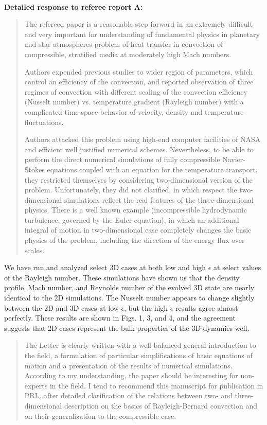 \documentclass[aps, 11pt, singlecolumn]{revtex4-1} %
\begin{document}
\begin{singlespace}
$\,$
\newline
$\,$
\newline

\textbf{Detailed response to referee report A:}

\begin{quotation}
The refereed paper is a reasonable step forward in an extremely
difficult and very important for understanding of fundamental physics
in planetary and star atmospheres problem of heat transfer in
convection of compressible, stratified media at moderately high Mach
numbers.

Authors expended previous studies to wider region of parameters, which
control an efficiency of the convection, and reported observation of
three regimes of convection with different scaling of the convection
efficiency (Nusselt number) vs. temperature gradient (Rayleigh number)
with a complicated time-space behavior of velocity, density and
temperature fluctuations.

Authors attacked this problem using high-end computer facilities of
NASA and efficient well justified numerical schemes. Nevertheless, to
be able to perform the direct numerical simulations of fully
compressible Navier-Stokes equations coupled with an equation for the
temperature transport, they restricted themselves by considering
two-dimensional version of the problem. Unfortunately, they did not
clarified, in which respect the two-dimensional simulations reflect
the real features of the three-dimensional physics. There is a well
known example (incompressible hydrodynamic turbulence, governed by the
Euler equation), in which an additional integral of motion in
two-dimensional case completely changes the basic physics of the
problem, including the direction of the energy flux over scales.
\end{quotation}

We have run and analyzed select 3D cases at both low and high $\epsilon$
at select values of the Rayleigh number.  These simulations have shown
us that the density profile, Mach number, and Reynolds number of the
evolved 3D state are nearly identical to the 2D simulations.  The Nusselt
number appears to change slightly between the 2D and 3D cases at low $\epsilon$, 
but the high $\epsilon$ results agree almost perfectly.  These results are shown
in Figs. 1, 3, and 4, and the agreement suggests that 2D cases
represent the bulk properties of the 3D dynamics well.

\begin{quotation}
The Letter is clearly written with a well balanced general
introduction to the field, a formulation of particular simplifications
of basic equations of motion and a presentation of the results of
numerical simulations. According to my understanding, the paper should
be interesting for non-experts in the field. I tend to recommend this
manuscript for publication in PRL, after detailed clarification of the
relations between two- and three-dimensional description on the basics
of Rayleigh-Bernard convection and on their generalization to the
compressible case.
\end{quotation}


\end{singlespace}
\end{document}
